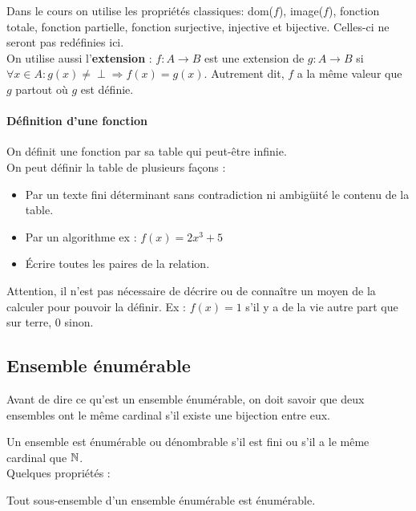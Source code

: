 Dans le cours on utilise les propriétés classiques: dom($f$), image($f$), fonction totale,
fonction partielle, fonction surjective, injective et bijective. Celles-ci ne 
seront pas redéfinies ici.\\
On utilise aussi l'\textbf{extension} : 
$f: A \rightarrow B$ est une extension de $g: A \rightarrow B$ si $\forall x \in A : g(x)\neq \perp \Rightarrow f(x) = g(x)$.
Autrement dit, $f$ a la même valeur que $g$ partout où $g$ est définie.

\paragraph{Définition d'une fonction}
\label{par:d_finition_d_une_fonciton}
On définit une fonction par sa table qui peut-être infinie.\\
On peut définir la table de plusieurs façons :
\begin{itemize}
	\item Par un texte fini déterminant sans contradiction ni ambigüité le contenu
		de la table.
	\item Par un algorithme ex : $f(x) = 2x^3+5$
	\item Écrire toutes les paires de la relation.
\end{itemize}
Attention, il n'est pas nécessaire de décrire ou de connaître un moyen de la calculer
pour pouvoir la définir. Ex : $f(x) = 1$ s'il y a de la vie autre part que sur terre,
$0$ sinon.

\subsection{Ensemble énumérable}
\label{sub:ensemble_num_rables}

Avant de dire ce qu'est un ensemble énumérable, on doit savoir que deux ensembles
ont le même cardinal s’il existe une bijection entre eux.

\begin{mydef}
	Un ensemble est énumérable ou dénombrable s'il est fini ou s'il a le même cardinal que $\mathbb{\mathbb{N}}$. \\
	Quelques propriétés : 
\end{mydef}
	
\begin{myprop}
	Tout sous-ensemble d'un ensemble énumérable est énumérable.
\end{myprop}

